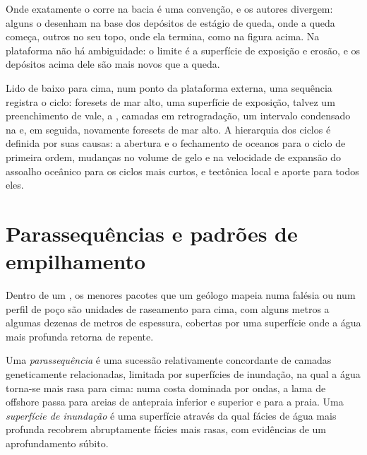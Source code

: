 Onde exatamente o  corre na bacia é uma convenção, e
os autores divergem: alguns o desenham na base dos depósitos de estágio de queda, onde
a queda começa, outros no seu topo, onde ela termina, como na figura acima.
Na plataforma não há ambiguidade: o limite é a superfície de exposição e
erosão, e os depósitos acima dele são mais novos que a queda.

Lido de baixo para cima, num ponto da plataforma externa, uma sequência registra o
ciclo: foresets de mar alto, uma superfície de exposição, talvez um preenchimento de
vale, a , camadas em retrogradação, um intervalo condensado na
 e, em seguida, novamente foresets de mar alto. A hierarquia dos
ciclos é definida por suas causas: a abertura e o fechamento de oceanos para o
ciclo de primeira ordem, mudanças no volume de gelo e na velocidade de expansão do
assoalho oceânico para os ciclos mais curtos, e tectônica local e aporte para todos
eles.

\section{Parassequências e padrões de empilhamento}\label{sec:b3:sequence-stratigraphy:parasequences}

Dentro de um , os menores pacotes que um geólogo mapeia numa falésia ou num
perfil de poço são unidades de raseamento para cima, com alguns metros a algumas dezenas de metros
de espessura, cobertas por uma superfície onde a água mais profunda retorna de repente.

\begin{definition}\label{def:b3:sequence-stratigraphy:parasequence}
Uma \emph{parassequência} é uma sucessão relativamente concordante
de camadas geneticamente relacionadas, limitada por superfícies de inundação, na qual
a água torna-se mais rasa para cima: numa costa dominada por ondas, a lama de offshore passa
para areias de antepraia inferior e superior e para a praia. Uma \emph{superfície de
inundação} é uma superfície através da qual fácies de água mais profunda
recobrem abruptamente fácies mais rasas, com evidências de um aprofundamento súbito.
\end{definition}

